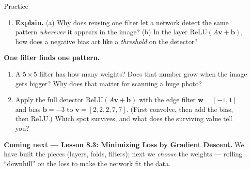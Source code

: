\documentclass[10pt]{article}
\newcommand{\vv}{\mathbf{v}}
\newcommand{\bb}{\mathbf{b}}
\newcommand{\ww}{\mathbf{w}}
\newcommand{\relu}{\mathrm{ReLU}}
\begin{document}
\begin{notesbox}{Practice}
\begin{enumerate}[leftmargin=1.9em, itemsep=11pt]
        would a \emph{full} layer have, and how many does the convolution use? (b) A small $28\times28$ image
        has $784$ pixels; a full layer to $784$ outputs uses $784^2=614{,}656$ weights. A $3\times3$ filter
        uses how many? 
  \item \textbf{Explain.} (a) Why does reusing one filter let a network detect the same pattern \emph{wherever}
        it appears in the image? (b) In the layer $\relu(A\vv+\bb)$, how does a negative bias act like a
        \emph{threshold} on the detector? 
\end{enumerate}
\end{notesbox}

\begin{extensionbox}
\textbf{One filter finds one pattern.}
\begin{enumerate}[label=(\alph*), leftmargin=1.8em, itemsep=5pt]
  \item A $5\times5$ filter has how many weights? Does that number grow when the image gets bigger? Why does
        that matter for scanning a huge photo?
  \item Apply the full detector $\relu(A\vv+\bb)$ with the edge filter $\ww=[-1,1]$ and bias $\bb=-3$ to
        $\vv=[2,2,2,7,7]$. (First convolve, then add the bias, then ReLU.) Which spot survives, and what does
        the surviving value tell you?
\end{enumerate}
\end{extensionbox}

\begin{spiralbox}
\textbf{Coming next --- Lesson 8.3: Minimizing Loss by Gradient Descent.} We have built the pieces (layers,
folds, filters); next we \emph{choose} the weights --- rolling ``downhill'' on the loss to make the network
fit the data.
\end{spiralbox}
\end{document}
